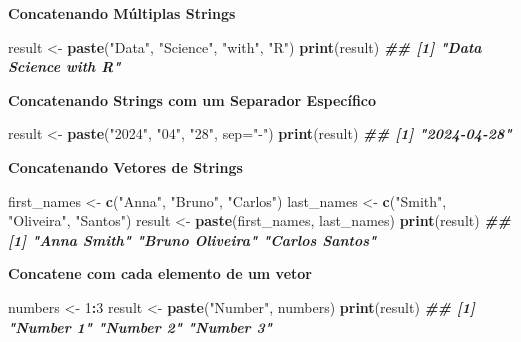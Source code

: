 \documentclass[
]{book}
\newenvironment{Shaded}{\begin{snugshade}}{\end{snugshade}}
\newcommand{\AttributeTok}[1]{\textcolor[rgb]{0.13,0.29,0.53}{#1}}
\newcommand{\DecValTok}[1]{\textcolor[rgb]{0.00,0.00,0.81}{#1}}
\newcommand{\DocumentationTok}[1]{\textcolor[rgb]{0.56,0.35,0.01}{\textbf{\textit{#1}}}}
\newcommand{\FunctionTok}[1]{\textcolor[rgb]{0.13,0.29,0.53}{\textbf{#1}}}
\newcommand{\NormalTok}[1]{#1}
\newcommand{\OtherTok}[1]{\textcolor[rgb]{0.56,0.35,0.01}{#1}}
\newcommand{\SpecialCharTok}[1]{\textcolor[rgb]{0.81,0.36,0.00}{\textbf{#1}}}
\newcommand{\StringTok}[1]{\textcolor[rgb]{0.31,0.60,0.02}{#1}}
\begin{document}
\textbf{Concatenando Múltiplas Strings}

\begin{Shaded}
\begin{Highlighting}[]
\NormalTok{result }\OtherTok{\textless{}{-}} \FunctionTok{paste}\NormalTok{(}\StringTok{"Data"}\NormalTok{, }\StringTok{"Science"}\NormalTok{, }\StringTok{"with"}\NormalTok{, }\StringTok{"R"}\NormalTok{)}
\FunctionTok{print}\NormalTok{(result)}
\DocumentationTok{\#\# [1] "Data Science with R"}
\end{Highlighting}
\end{Shaded}

\textbf{Concatenando Strings com um Separador Específico}

\begin{Shaded}
\begin{Highlighting}[]
\NormalTok{result }\OtherTok{\textless{}{-}} \FunctionTok{paste}\NormalTok{(}\StringTok{"2024"}\NormalTok{, }\StringTok{"04"}\NormalTok{, }\StringTok{"28"}\NormalTok{, }\AttributeTok{sep=}\StringTok{"{-}"}\NormalTok{)}
\FunctionTok{print}\NormalTok{(result)}
\DocumentationTok{\#\# [1] "2024{-}04{-}28"}
\end{Highlighting}
\end{Shaded}

\textbf{Concatenando Vetores de Strings}

\begin{Shaded}
\begin{Highlighting}[]
\NormalTok{first\_names }\OtherTok{\textless{}{-}} \FunctionTok{c}\NormalTok{(}\StringTok{"Anna"}\NormalTok{, }\StringTok{"Bruno"}\NormalTok{, }\StringTok{"Carlos"}\NormalTok{)}
\NormalTok{last\_names }\OtherTok{\textless{}{-}} \FunctionTok{c}\NormalTok{(}\StringTok{"Smith"}\NormalTok{, }\StringTok{"Oliveira"}\NormalTok{, }\StringTok{"Santos"}\NormalTok{)}
\NormalTok{result }\OtherTok{\textless{}{-}} \FunctionTok{paste}\NormalTok{(first\_names, last\_names)}
\FunctionTok{print}\NormalTok{(result)}
\DocumentationTok{\#\# [1] "Anna Smith"     "Bruno Oliveira" "Carlos Santos"}
\end{Highlighting}
\end{Shaded}

\textbf{Concatene com cada elemento de um vetor}

\begin{Shaded}
\begin{Highlighting}[]
\NormalTok{numbers }\OtherTok{\textless{}{-}} \DecValTok{1}\SpecialCharTok{:}\DecValTok{3}
\NormalTok{result }\OtherTok{\textless{}{-}} \FunctionTok{paste}\NormalTok{(}\StringTok{"Number"}\NormalTok{, numbers)}
\FunctionTok{print}\NormalTok{(result)}
\DocumentationTok{\#\# [1] "Number 1" "Number 2" "Number 3"}
\end{Highlighting}
\end{Shaded}
\end{document}
